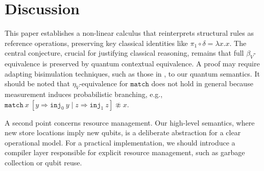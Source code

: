\section{Discussion}
This paper establishes a non-linear calculus that reinterprets structural rules as reference operations, preserving key classical identities like $\pi_{1}\circ\delta=\lambda x.x$.
The central conjecture, crucial for justifying classical reasoning, remains that full $\beta_V$-equivalence is preserved by quantum contextual equivalence.
A proof may require adapting bisimulation techniques, such as those in \cite{DALLAGO2014_CoinductiveEquivalencesHigherorder,SANGIORGI2019_EnvironmentalBisimulationsProbabilistic}, to our quantum semantics.
It should be noted that $\eta_V$-equivalence for $\texttt{match}$ does not hold in general because measurement induces probabilistic branching, e.g., $\texttt{match}\ x\ [y\Rightarrow \texttt{inj}_0\ y\mid z\Rightarrow \texttt{inj}_1\ z] \not\approx x$.

A second point concerns resource management.
Our high-level semantics, where new store locations imply new qubits, is a deliberate abstraction for a clear operational model.
For a practical implementation, we should introduce a compiler layer responsible for explicit resource management, such as garbage collection or qubit reuse.
